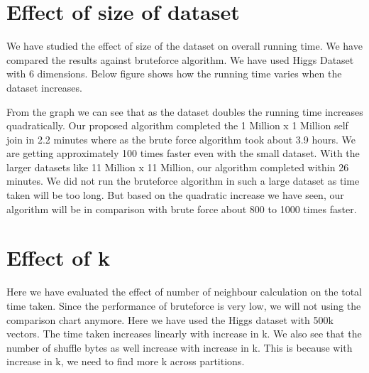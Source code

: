 \section{Effect of size of dataset}

We have studied the effect of size of the dataset on overall running
time. We have compared the results against bruteforce algorithm.
We have used Higgs Dataset with 6 dimensions. Below figure shows how
the running time varies when the dataset increases.

From the graph we can see that as the dataset doubles the running time
increases quadratically. Our proposed algorithm
completed the 1 Million x 1 Million self join
in 2.2 minutes where as the brute force algorithm took about 3.9
hours. We are getting approximately 100 times faster even with the small
dataset. With the larger datasets like 11 Million x 11 Million, our
algorithm completed within 26 minutes. We did not run the bruteforce
algorithm in such a large dataset as time taken will be too long. But
based on the quadratic increase we have seen, our algorithm will be in comparison with
brute force about 800 to 1000 times faster.

\bigskip


\section{Effect of k}

Here we have evaluated the effect of number of neighbour calculation
on the total time taken. Since the performance of bruteforce is very low, we will not using the
comparison chart anymore. Here we have used the Higgs dataset with
500k vectors. The time taken increases linearly with increase in k. We
also see that the number of shuffle bytes as well increase with
increase in k. This is because with increase in k, we need to find
more k across partitions.

